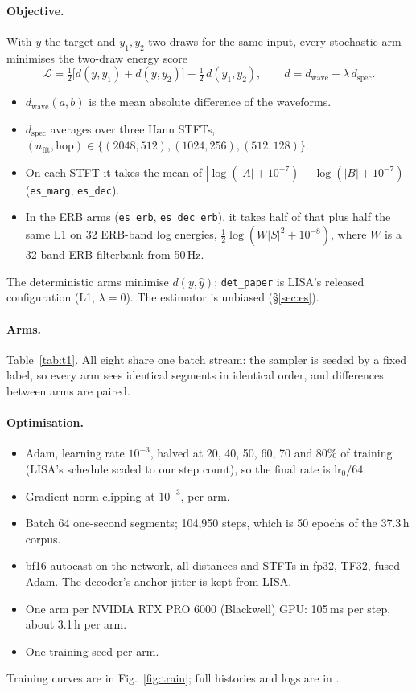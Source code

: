 \documentclass[10pt,letterpaper]{article}
\newcommand{\file}[1]{\path{#1}}
\begin{document}
\paragraph{Objective.} With $y$ the target and $y_1,y_2$ two draws for the same input, every stochastic arm
minimises the two-draw energy score
\begin{equation}
\mathcal L = \tfrac12\big[d(y,y_1)+d(y,y_2)\big]-\tfrac12\, d(y_1,y_2),\qquad
d = d_{\mathrm{wave}} + \lambda\, d_{\mathrm{spec}} .
\end{equation}
\begin{itemize}
\item $d_{\mathrm{wave}}(a,b)$ is the mean absolute difference of the waveforms.
\item $d_{\mathrm{spec}}$ averages over three Hann STFTs, $(n_{\mathrm{fft}},\mathrm{hop})\in\{(2048,512),
(1024,256),(512,128)\}$.
\item On each STFT it takes the mean of $|\log(|A|+10^{-7})-\log(|B|+10^{-7})|$ (\texttt{es\_marg},
\texttt{es\_dec}).
\item In the ERB arms (\texttt{es\_erb}, \texttt{es\_dec\_erb}), it takes half of that plus half the same L1
on 32 ERB-band log energies, $\tfrac12\log(W|S|^2+10^{-8})$, where $W$ is a 32-band ERB filterbank from 50\,Hz.
\end{itemize}
The deterministic arms minimise $d(y,\hat y)$; \texttt{det\_paper} is LISA's released configuration (L1,
$\lambda=0$). The estimator is unbiased (\S\ref{sec:es}).

\paragraph{Arms.} Table~\ref{tab:t1}. All eight share one batch stream: the sampler is seeded by a fixed label,
so every arm sees identical segments in identical order, and differences between arms are paired.

\paragraph{Optimisation.}
\begin{itemize}
\item Adam, learning rate $10^{-3}$, halved at 20, 40, 50, 60, 70 and 80\% of training (LISA's schedule scaled
to our step count), so the final rate is $\mathrm{lr}_0/64$.
\item Gradient-norm clipping at $10^{-3}$, per arm.
\item Batch 64 one-second segments; 104{,}950 steps, which is 50 epochs of the 37.3\,h corpus.
\item bf16 autocast on the network, all distances and STFTs in fp32, TF32, fused Adam. The decoder's anchor
jitter is kept from LISA.
\item One arm per NVIDIA RTX PRO 6000 (Blackwell) GPU: 105\,ms per step, about 3.1\,h per arm.
\item One training seed per arm.
\end{itemize}
Training curves are in Fig.~\ref{fig:train}; full histories and logs are in \file{results/training/}.
\end{document}
